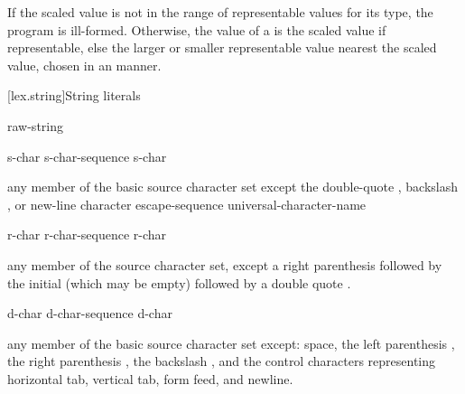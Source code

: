 \pnum
If the scaled value is not in the range of representable
values for its type, the program is ill-formed.
Otherwise, the value of a 
is the scaled value if representable,
else the larger or smaller representable value nearest the scaled value,
chosen in an  manner.

[lex.string]{String literals}

%
\begin{bnf}
\br
       \br
      raw-string
\end{bnf}

\begin{bnf}
\br
    s-char\br
    s-char-sequence s-char
\end{bnf}

\begin{bnf}
\br
    \textnormal{any member of the basic source character set except the double-quote , backslash \terminal{\textbackslash}, or new-line character}\br
    escape-sequence\br
    universal-character-name
\end{bnf}

\begin{bnf}
\br
      \terminal{(}  \terminal{)}  
\end{bnf}

\begin{bnf}
\br
    r-char\br
    r-char-sequence r-char
\end{bnf}

\begin{bnf}
\br
    \textnormal{any member of the source character set, except a right parenthesis \terminal{)} followed by}\br
    \bnfindent\textnormal{the initial  (which may be empty) followed by a double quote .}
\end{bnf}

\begin{bnf}
\br
    d-char\br
    d-char-sequence d-char
\end{bnf}

\begin{bnf}
\br
    \textnormal{any member of the basic source character set except:}\br
    \bnfindent\textnormal{space, the left parenthesis \terminal{(}, the right parenthesis \terminal{)}, the backslash \terminal{\textbackslash}, and the control characters}\br
    \bnfindent\textnormal{representing horizontal tab, vertical tab, form feed, and newline.}
\end{bnf}

